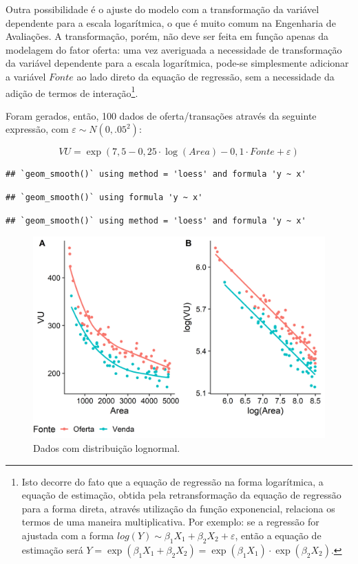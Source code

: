 \documentclass{article}
\begin{document}
Outra possibilidade é o ajuste do modelo com a transformação da variável
dependente para a escala logarítmica, o que é muito comum na Engenharia
de Avaliações. A transformação, porém, não deve ser feita em função
apenas da modelagem do fator oferta: uma vez averiguada a necessidade de
transformação da variável dependente para a escala logarítmica, pode-se
simplesmente adicionar a variável \(Fonte\) ao lado direto da equação de
regressão, sem a necessidade da adição de termos de interação\footnote{Isto
  decorre do fato que a equação de regressão na forma logarítmica, a
  equação de estimação, obtida pela retransformação da equação de
  regressão para a forma direta, através utilização da função
  exponencial, relaciona os termos de uma maneira multiplicativa. Por
  exemplo: se a regressão for ajustada com a forma
  \(log(Y) \sim \beta_1 X_1 + \beta_2 X_2 + \varepsilon\), então a
  equação de estimação será
  \(Y = \exp(\beta_1 X_1 + \beta_2 X_2) = \exp(\beta_1 X_1)\cdot \exp(\beta_2 X_2)\).}.

Foram gerados, então, 100 dados de oferta/transações através da seguinte
expressão, com \(\varepsilon \sim N(0, .05^2)\):

\[VU = \exp(7,5 - 0,25\cdot \log(Area) - 0,1\cdot Fonte + \varepsilon)\]

\begin{verbatim}
## `geom_smooth()` using method = 'loess' and formula 'y ~ x'
\end{verbatim}

\begin{verbatim}
## `geom_smooth()` using formula 'y ~ x'
\end{verbatim}

\begin{verbatim}
## `geom_smooth()` using method = 'loess' and formula 'y ~ x'
\end{verbatim}

\begin{figure}
\centering
\includegraphics{./images/dados2-1.png}
\caption{Dados com distribuição lognormal.}
\end{figure}
\end{document}
